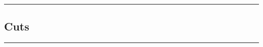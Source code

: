 \documentclass[a4paper,12pt]{article}
\begin{document}
\vspace{0em} %
\hrule height 1pt width 1\textwidth %
\vspace{1em} %



\subsection{Cuts}

\vspace{1em} %
\hrule height 1pt width 1\textwidth %
\vspace{1em} %
\end{document}
